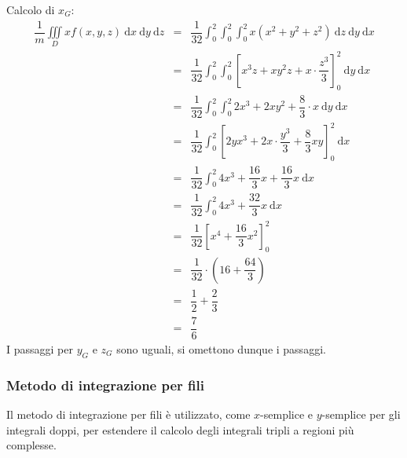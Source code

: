 \documentclass[a4paper]{article}
\begin{document}
	\newpage

	\noindent
	Calcolo di $x_{G}$:
	\begin{equation*}
		\begin{array}{rcl}
			\dfrac{1}{m} \displaystyle\iiint\limits_{D} x f\left(x,y,z\right) \:\mathrm{d}x\:\mathrm{d}y\:\mathrm{d}z
			&=&
			\dfrac{1}{32}\displaystyle\int_{0}^{2} \int_{0}^{2} \int_{0}^{2} x\left(x^{2}+y^{2}+z^{2}\right) \:\mathrm{d}z \: \mathrm{d}y \:\mathrm{d}x \\ [1.5em]
			&=&
			\dfrac{1}{32}\displaystyle\int_{0}^{2} \int_{0}^{2} \left[x^{3}z + xy^{2}z + x \cdot \dfrac{z^{3}}{3}\right]_{0}^{2} \: \mathrm{d}y \:\mathrm{d}x \\ [1.5em]
			&=&
			\dfrac{1}{32}\displaystyle\int_{0}^{2} \int_{0}^{2} 2x^{3} + 2xy^{2} + \dfrac{8}{3} \cdot x \: \mathrm{d}y \:\mathrm{d}x \\ [1.5em]
			&=&
			\dfrac{1}{32}\displaystyle\int_{0}^{2} \left[2yx^{3} + 2x \cdot \dfrac{y^{3}}{3} + \dfrac{8}{3}xy\right]_{0}^{2} \:\mathrm{d}x \\ [1.5em]
			&=&
			\dfrac{1}{32}\displaystyle\int_{0}^{2} 4x^{3} + \dfrac{16}{3}x + \dfrac{16}{3}x \:\mathrm{d}x \\ [1.5em]
			&=&
			\dfrac{1}{32}\displaystyle\int_{0}^{2} 4x^{3} + \dfrac{32}{3}x \:\mathrm{d}x \\ [1.5em]
			&=&
			\dfrac{1}{32}\left[x^{4} + \dfrac{16}{3}x^{2}\right]_{0}^{2} \\ [1.5em]
			&=&
			\dfrac{1}{32} \cdot \left(16 + \dfrac{64}{3}\right) \\ [1.5em]
			&=&
			\dfrac{1}{2} + \dfrac{2}{3} \\ [1em]
			&=&
			\dfrac{7}{6}
		\end{array}
	\end{equation*}
	I passaggi per $y_{G}$ e $z_{G}$ sono uguali, si omettono dunque i passaggi.

	\newpage

	\subsubsection{Metodo di integrazione per fili}

	Il metodo di integrazione per fili è utilizzato, come $x$-semplice e $y$-semplice per gli integrali doppi, per estendere il calcolo degli integrali tripli a regioni più complesse.
\end{document}

